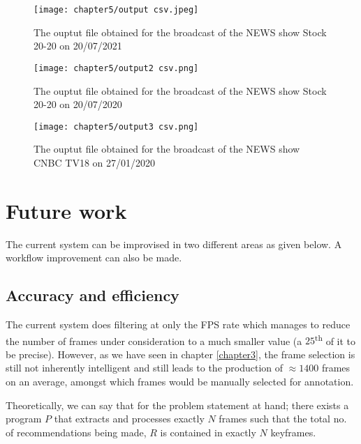 \begin{figure}[h]
  \centering
  \texttt{[image: chapter5/output csv.jpeg]}
  \caption{The ouptut file obtained for the broadcast of the NEWS show Stock 20-20 on 20/07/2021}
  \label{fig:out1}
\end{figure}

\begin{figure}[h]
  \centering
  \texttt{[image: chapter5/output2 csv.png]}
  \caption{The ouptut file obtained for the broadcast of the NEWS show Stock 20-20 on 20/07/2020}
  \label{fig:out2}
\end{figure} \newpage

\begin{figure}[h]
  \centering
  \texttt{[image: chapter5/output3 csv.png]}
  \caption{The ouptut file obtained for the broadcast of the NEWS show CNBC TV18 on 27/01/2020}
  \label{fig:out2}
\end{figure}


\section{Future work}

The current system can be improvised in two different areas as given below. A workflow improvement can also be made.

\subsection{Accuracy and efficiency}

The current system does filtering at only the FPS rate which manages to reduce the number of frames under consideration to a much smaller value (a $25$\textsuperscript{th} of it to be precise). However, as we have seen in chapter \ref{chapter3}, the frame selection is still not inherently intelligent and still leads to the production of  $ \approx 1400$ frames on an average, amongst which frames would be manually selected for annotation. \par

Theoretically, we can say that for the problem statement at hand; there exists a program $P$ that extracts and processes exactly $N$ frames such that the total no. of recommendations being made, $R$ is contained in exactly $N$ keyframes. \par

